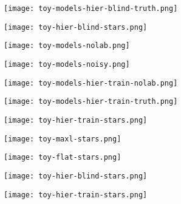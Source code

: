 \documentclass{beamer}
\begin{document}
\begin{frame}
\texttt{[image: toy-models-hier-blind-truth.png]}
\end{frame}

\begin{frame}
\texttt{[image: toy-hier-blind-stars.png]}
\end{frame}

\begin{frame}
\texttt{[image: toy-models-nolab.png]}
\end{frame}

\begin{frame}
\texttt{[image: toy-models-noisy.png]}
\end{frame}

\begin{frame}
\texttt{[image: toy-models-hier-train-nolab.png]}
\end{frame}

\begin{frame}
\texttt{[image: toy-models-hier-train-truth.png]}
\end{frame}

\begin{frame}
\texttt{[image: toy-hier-train-stars.png]}
\end{frame}

\begin{frame}
\texttt{[image: toy-maxl-stars.png]}
\end{frame}

\begin{frame}
\texttt{[image: toy-flat-stars.png]}
\end{frame}

\begin{frame}
\texttt{[image: toy-hier-blind-stars.png]}
\end{frame}

\begin{frame}
\texttt{[image: toy-hier-train-stars.png]}
\end{frame}

\whiteonblack
\begin{frame}
~
\end{frame}
\blackonwhite
\end{document}
